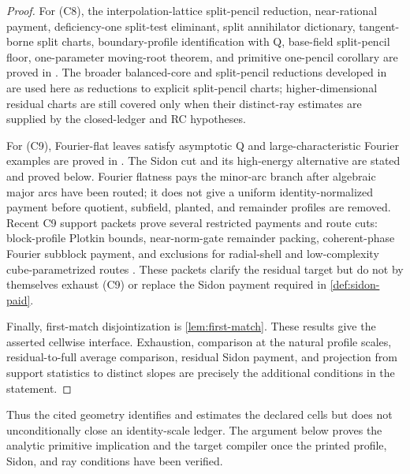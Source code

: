 \documentclass[11pt,a4paper]{amsart}
\numberwithin{equation}{section}
\theoremstyle{remark}
\begin{document}
\begin{proof}
For \textup{(C8)}, the interpolation-lattice split-pencil reduction, near-rational payment, deficiency-one split-test eliminant, split annihilator dictionary, tangent-borne split charts, boundary-profile identification with Q, base-field split-pencil floor, one-parameter moving-root theorem, and primitive one-pencil corollary are proved in \cite[split-pencil and BC sections]{Cho26Grande}.  The broader balanced-core and split-pencil reductions developed in \cite[rank-one and split-pencil reductions]{Cho26CapV13} are used here as reductions to explicit split-pencil charts; higher-dimensional residual charts are still covered only when their distinct-ray estimates are supplied by the closed-ledger and RC hypotheses.

For \textup{(C9)}, Fourier-flat leaves satisfy asymptotic Q and
large-characteristic Fourier examples are proved in
\cite[Fourier-flat Q section]{Cho26Grande}.  The Sidon cut and its
high-energy alternative are stated and proved below.  Fourier flatness pays
the minor-arc branch after algebraic major arcs have been routed; it does
not give a uniform identity-normalized payment before quotient, subfield,
planted, and remainder profiles are removed.
Recent C9 support packets prove several restricted payments and route cuts:
block-profile Plotkin bounds, near-norm-gate remainder packing,
coherent-phase Fourier subblock payment, and exclusions for radial-shell and
low-complexity cube-parametrized routes \cite{DannyC9Packets}.  These packets
clarify the residual target but do not by themselves exhaust \textup{(C9)} or
replace the Sidon payment required in \cref{def:sidon-paid}.

Finally, first-match disjointization is \cref{lem:first-match}.  These
results give the asserted cellwise interface.  Exhaustion, comparison at
the natural profile scales, residual-to-full average comparison, residual
Sidon payment, and projection from support statistics to distinct slopes
are precisely the additional conditions in the statement.
\end{proof}

Thus the cited geometry identifies and estimates the declared cells but
does not unconditionally close an identity-scale ledger.  The argument
below proves the analytic primitive implication and the target compiler
once the printed profile, Sidon, and ray conditions have been verified.
\end{document}
